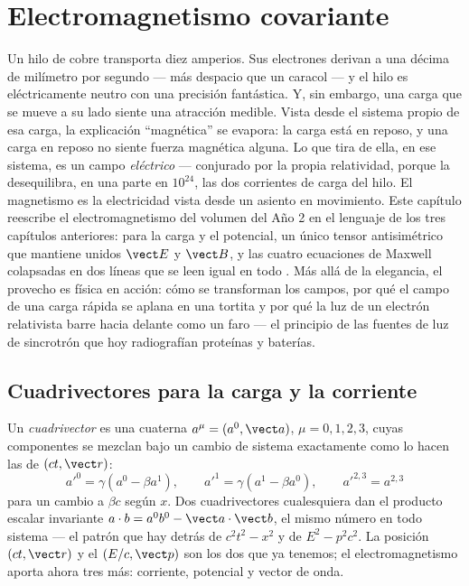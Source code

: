\chapter{Electromagnetismo covariante}\label{ch:b3:covariant-electromagnetism}

Un hilo de cobre transporta diez amperios. Sus electrones derivan a una
décima de milímetro por segundo --- más despacio que un caracol --- y el
hilo es eléctricamente neutro con una precisión fantástica. Y, sin embargo,
una carga que se mueve a su lado siente una atracción medible. Vista desde
el sistema propio de esa carga, la explicación ``magnética'' se evapora: la
carga está en reposo, y una carga en reposo no siente fuerza magnética
alguna. Lo que tira de ella, en ese sistema, es un campo \emph{eléctrico}
--- conjurado por la propia relatividad, porque la  desequilibra, en una parte en $10^{24}$, las dos corrientes de
carga del hilo. El magnetismo es la electricidad vista desde un asiento en
movimiento. Este capítulo reescribe el electromagnetismo del volumen del Año
2 en el lenguaje de los tres capítulos anteriores:  para la
carga y el potencial, un único tensor antisimétrico que mantiene unidos
$\vect E$ y $\vect B$, y las cuatro ecuaciones de Maxwell colapsadas en dos
líneas que se leen igual en todo . Más allá de la elegancia,
el provecho es física en acción: cómo se transforman los campos, por qué el
campo de una carga rápida se aplana en una tortita y por qué la luz de un
electrón relativista barre hacia delante como un faro --- el principio de
las fuentes de luz de sincrotrón que hoy radiografían proteínas y baterías.

\section{Cuadrivectores para la carga y la corriente}

\begin{definition}[Cuadrivectores]\label{def:b3:covariant-electromagnetism:fourvector}
Un \emph{cuadrivector} es una cuaterna $a^\mu = (a^0, \vect a)$, $\mu =
0, 1, 2, 3$, cuyas componentes se mezclan bajo un cambio de sistema
exactamente como lo hacen las de $(ct,
\vect r)$:
\[
a'^0 = \gamma(a^0 - \beta a^1) , \qquad
a'^1 = \gamma(a^1 - \beta a^0) , \qquad
a'^{2,3} = a^{2,3}
\]
para un cambio a $\beta c$ según $x$. Dos cuadrivectores cualesquiera dan el
producto escalar invariante $a\cdot b = a^0b^0 - \vect a\cdot\vect b$,
el mismo número en todo sistema --- el patrón que hay detrás de $c^2t^2 - x^2$
y de $E^2 - p^2c^2$. La posición $(ct, \vect r)$ y el 
$(E/c, \vect p)$ son los dos que ya tenemos; el electromagnetismo aporta
ahora tres más: corriente, potencial y vector de onda.
\end{definition}

